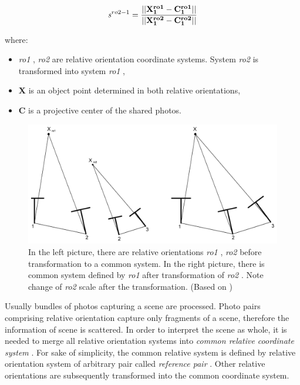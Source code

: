 \documentclass[a4paper,12pt]{article}
\newcommand{\evect}[1]{%
{\bf #1}%
}
\newcommand{\escal}[1]{%
{\it #1}%
}
\newcommand{\term}[1]{%
{\it #1}%
}
\begin{document}
\begin{equation}
\escal{s}^{ro2-1} = \frac{||\mathbf{\evect{X}^{ro1}_{1} - \evect{C^{ro1}_{1}}}||}
	                {||\mathbf{\evect{X}^{ro2}_{1} - \evect{C^{ro2}_{1}}}||}
\end{equation}

\noindent where:
\begin{itemize}
\item \term{ro1}, \term{ro2} are relative orientation coordinate systems. 
System \term{ro2} is transformed into system \term{ro1},
\item \evect{X} is an object point determined in both relative orientations,
\item \evect{C} is a projective center of the shared photos.
\end{itemize}

\begin{figure}[h]
    \centering
    \includegraphics[scale=0.25]{figures/rel_or.png}
    \caption{In the left picture, there are relative orientations \term{ro1}, \term{ro2} before transformation 
    to a common system. 
    In the right picture, there is common system defined by \term{ro1} after transformation of \term{ro2}. 
    Note change of \term{ro2} scale after the transformation. (Based on \cite[p. 20]{pietzsch2001robot})}
    \label{fig:eo_amb}
\end{figure}



Usually bundles of photos capturing a scene are processed. Photo pairs comprising relative orientation capture only fragments of a scene, 
therefore the information of scene is scattered.  
In order to interpret the scene as whole, it is needed to merge all relative orientation systems into \term{common relative coordinate system}.
For sake of simplicity, the common relative system is defined by relative orientation system of arbitrary pair called \term{reference pair}.
Other relative orientations are subsequently transformed into the common coordinate system. 
\end{document}
